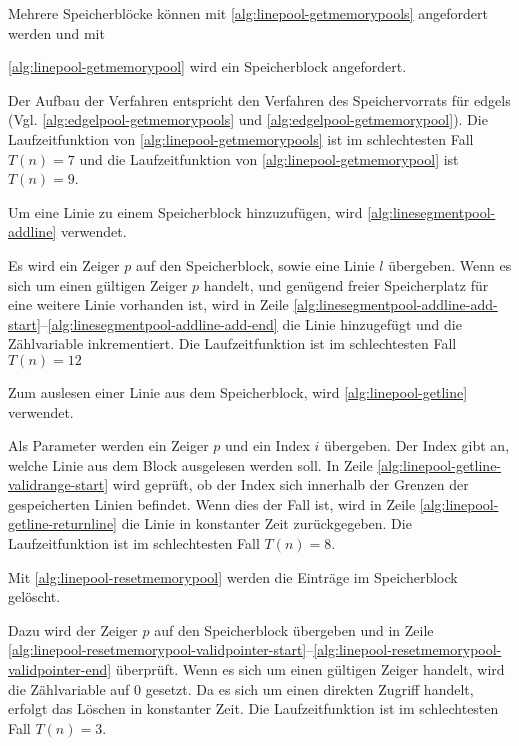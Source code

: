 Mehrere Speicherblöcke können mit \autoref{alg:linepool-getmemorypools} angefordert werden und mit

 \autoref{alg:linepool-getmemorypool} wird ein Speicherblock angefordert.

Der Aufbau der Verfahren entspricht den Verfahren des Speichervorrats für \glspl{edgel}
 (Vgl. \autoref{alg:edgelpool-getmemorypools} und \autoref{alg:edgelpool-getmemorypool}).
Die Laufzeitfunktion von \autoref{alg:linepool-getmemorypools} ist im schlechtesten Fall $T(n) = 7$ und die
 Laufzeitfunktion von \autoref{alg:linepool-getmemorypool} ist $T(n) = 9$.

Um eine Linie zu einem Speicherblock hinzuzufügen, wird \autoref{alg:linesegmentpool-addline} verwendet.

Es wird ein Zeiger $p$ auf den Speicherblock, sowie eine Linie $l$ übergeben. Wenn es sich um einen gültigen Zeiger $p$
 handelt, und genügend freier Speicherplatz für eine weitere Linie vorhanden ist, wird in Zeile
 \ref{alg:linesegmentpool-addline-add-start}--\ref{alg:linesegmentpool-addline-add-end} die Linie hinzugefügt und die
 Zählvariable inkrementiert. Die Laufzeitfunktion ist im schlechtesten Fall $T(n) = 12$

Zum auslesen einer Linie aus dem Speicherblock, wird \autoref{alg:linepool-getline} verwendet.

Als Parameter werden ein Zeiger $p$ und ein Index $i$ übergeben. Der Index gibt an, welche Linie aus dem Block
 ausgelesen werden soll. In Zeile \ref{alg:linepool-getline-validrange-start} wird geprüft, ob der Index sich innerhalb
 der Grenzen der gespeicherten Linien befindet. Wenn dies der Fall ist, wird in Zeile
 \ref{alg:linepool-getline-returnline} die Linie in konstanter Zeit zurückgegeben. Die Laufzeitfunktion ist im schlechtesten Fall $T(n) = 8$.

Mit \autoref{alg:linepool-resetmemorypool} werden die Einträge im Speicherblock gelöscht.

Dazu wird der Zeiger $p$ auf den Speicherblock übergeben und in Zeile
 \ref{alg:linepool-resetmemorypool-validpointer-start}--\ref{alg:linepool-resetmemorypool-validpointer-end} überprüft.
 Wenn es sich um einen gültigen Zeiger handelt, wird die Zählvariable auf $0$ gesetzt. Da es sich um einen direkten
 Zugriff handelt, erfolgt das Löschen in konstanter Zeit. Die Laufzeitfunktion ist im schlechtesten Fall $T(n) = 3$.

